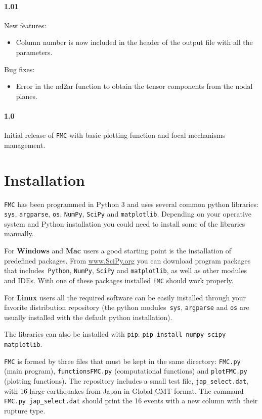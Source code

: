 \documentclass[11pt,a4paper,english]{article}
\numberwithin{equation}{section}
\begin{document}
\paragraph{1.01}

New features:
\begin{itemize}
\item Column number is now included in the header of the output file with
all the parameters.
\end{itemize}
Bug fixes:
\begin{itemize}
\item Error in the nd2ar function to obtain the tensor components from the
nodal planes.
\end{itemize}

\paragraph{1.0}

Initial release of \texttt{FMC} with basic plotting function and focal
mechanisms management.

\section{Installation}

\texttt{FMC} has been programmed in Python 3 and uses several
common python libraries: \texttt{sys}, \texttt{argparse}, \texttt{os},
\texttt{NumPy}, \texttt{SciPy} and \texttt{matplotlib}. Depending on your operative
system and Python installation you could need to install some of the
libraries manually.

For \textbf{Windows} and \textbf{Mac} users a good starting point
is the installation of predefined packages. From \href{http://www.SciPy.org}{www.SciPy.org}
you can download program packages that includes\texttt{ Python}, \texttt{NumPy},
\texttt{SciPy} and \texttt{matplotlib}, as well as other modules and IDEs. With one
of these packages installed \texttt{FMC} should work properly.

For \textbf{Linux} users all the required software can be easily installed
through your favorite distribution repository (the python modules\texttt{
sys}, \texttt{argparse} and \texttt{os} are usually installed with
the default python installation).

The libraries can also be installed with \texttt{pip}: \texttt{pip install numpy scipy matplotlib}.

\texttt{FMC} is formed by three files that must be kept in the same directory: \texttt{FMC.py} (main program), \texttt{functionsFMC.py} (computational functions) and \texttt{plotFMC.py} (plotting functions). The repository includes a small test file, \texttt{jap\_select.dat}, with 16 large earthquakes from Japan in Global CMT format. The command \texttt{FMC.py jap\_select.dat} should print the 16 events with a new column with their rupture type.
\end{document}
